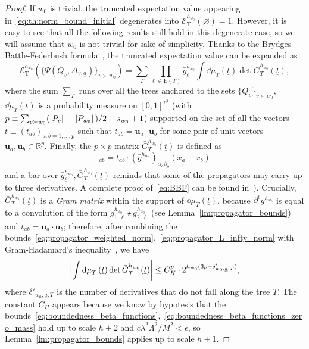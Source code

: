 \documentclass[a4paper, 11pt]{article}
\newcommand{\R}{\mathbb{R}}
\newcommand{\cutoff}{\Lambda}								%
\newcommand{\sing}[2]{{#1}^{#2}}							%
\newcommand{\edg}{\mathrm{E}}								%
\newcommand{\TExp}[1]{\mathcal{E}^{#1}_%
{\scriptscriptstyle{\mathrm{T}}}}							%
\theoremstyle{thm}
\begin{document}
\begin{proof}
If $w_0$ is trivial, the truncated expectation value appearing in~\eqref{eq:th:norm_bound_initial} degenerates into $\TExp{h_{w_0}}(\varnothing) = 1$. However, it is easy to see that all the following results still hold in this degenerate case, so we will assume that $w_0$ is not trivial for sake of simplicity. Thanks to the Brydges-Battle-Federbush formula~\cite{Battle_1984, Gawedzki_1985, Lesniewski_1987}, the truncated expectation value can be expanded as
\begin{equation}
\label{eq:BBF}
\TExp{h_{w_0}}( \lbrace \Psi(Q_v, \Delta_{v, \underline{a}}) \rbrace_{v \succ w_0} ) = \sum_T \prod_{\ell \in \edg(T)} \sing{\bar{g}}{h_{w_0}}_\ell \int \dd{\mu}_T(\underline{t}) \det \bar{G}^{h_{w_0}}_T(\underline{t}),
\end{equation}
where the sum $\sum_T$ runs over all the trees anchored to the sets $\lbrace Q_v \rbrace_{v \succ w_0}$, $\dd{\mu}_T(\underline{t})$ is a probability measure on $[0, 1]^{p^2}$ (with $p \equiv \sum_{v \succ w_0} (\abs*{P_v} - \abs*{P_{w_0}})/2 - s_{w_0} + 1$) supported on the set of all the vectors $\underline{t} \equiv (t_{ab})_{a, b = 1, \dots, p}$ such that $t_{ab} = \mathbf{u}_a \cdot \mathbf{u}_b$ for some pair of unit vectors $\mathbf{u}_a, \mathbf{u}_b \in \R^p$. Finally, the $p \times p$ matrix $\bar{G}^{h_{w_0}}_T(\underline{t})$ is defined as
\begin{equation}
[\bar{G}^{h_{w_0}}_T(\underline{t})]_{ab} = t_{ab} \cdot (\sing{\bar{g}}{h_{w_0}})_{\alpha_a \beta_b}(x_a - x_b)
\end{equation}
and a bar over $\sing{\bar{g}}{h_{w_0}}_\ell, \bar{G}^{h_{w_0}}_T(\underline{t})$ reminds that some of the propagators may carry up to three derivatives. A complete proof of~\eqref{eq:BBF} can be found in~\cite[Appendix A.3.2]{Gentile_2001}). Crucially, $\bar{G}^{h_{w_0}}_T(\underline{t})$ is a \emph{Gram matrix} within the support of $\dd{\mu}_T(\underline{t})$, because $\partial^\ell \sing{g}{h_{w_0}}$ is equal to a convolution of the form $\sing{g}{h_{w_0}}_{1, \ell} \star \sing{g}{h_{w_0}}_{2, \ell}$ (see Lemma~\ref{lm:propagator_bounds}) and $t_{ab} = \mathbf{u}_a \cdot \mathbf{u}_b$; therefore, after combining the bounds~\eqref{eq:propagator_weighted_norm},~\eqref{eq:propagator_L_infty_norm} with Gram-Hadamard's inequality~\cite[Theorem A.1]{Gentile_2001}, we have
\begin{equation}
\label{eq:gram_hadamard}
\abs{\int \dd{\mu}_T(\underline{t}) \det \bar{G}^{h_{w_0}}_T(\underline{t})} \le  C_H^p \cdot 2^{h_{w_0}(3p + \delta'_{w_0, \underline{a}, T})},
\end{equation}
where $\delta'_{w_0, \underline{a}, T}$ is the number of derivatives that do not fall along the tree $T$. The constant $C_H$ appears because we know by hypotesis that the bounds~\eqref{eq:boundedness_beta_functions},~\eqref{eq:boundedness_beta_functions_zero_mass} hold up to scale $h+2$ and $c \lambda^2 \cutoff^2/M^2 < \epsilon$, so Lemma~\ref{lm:propagator_bounds} applies up to scale $h+1$.


\end{proof}
\end{document}
